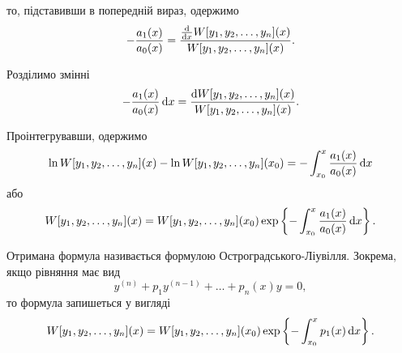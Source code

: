 то, підставивши в попередній вираз, одержимо
\begin{equation*}
	- \frac{a_1(x)}{a_0(x)} = \frac{\frac{\mathop{}\!\mathrm{d}}{\mathop{}\!\mathrm{d} x} W[y_1, y_2, \ldots, y_n](x)}{W[y_1, y_2, \ldots, y_n](x)}.
\end{equation*}

Розділимо змінні
\begin{equation*}
	- \frac{a_1(x)}{a_0(x)} \mathop{}\!\mathrm{d} x = \frac{\mathop{}\!\mathrm{d} W[y_1, y_2, \ldots, y_n](x)}{W[y_1, y_2, \ldots, y_n](x)}.
\end{equation*}

Проінтегрувавши, одержимо
\begin{equation*}
	\ln W[y_1, y_2, \ldots, y_n](x) - \ln W[y_1, y_2, \ldots, y_n](x_0) = -\int_{x_0}^x \frac{a_1(x)}{a_0(x)} \mathop{}\!\mathrm{d} x
\end{equation*}
або
\begin{equation*}
	W[y_1, y_2, \ldots, y_n](x) = W[y_1, y_2, \ldots, y_n](x_0) \exp \left\{ -\int_{x_0}^x \frac{a_1(x)}{a_0(x)} \mathop{}\!\mathrm{d} x \right\}.
\end{equation*}

Отримана формула називається формулою Остроградського-Ліувілля. Зокрема, якщо рівняння має вид
\begin{equation*}
	y^{(n)} + p_1 y^{(n - 1)} + \ldots + p_n(x) y = 0,
\end{equation*}
то формула запишеться у вигляді
\begin{equation*}
	W[y_1, y_2, \ldots, y_n](x) = W[y_1, y_2, \ldots, y_n](x_0) \exp \left\{ -\int_{x_0}^x p_1(x) \mathop{}\!\mathrm{d} x \right\}.
\end{equation*}
